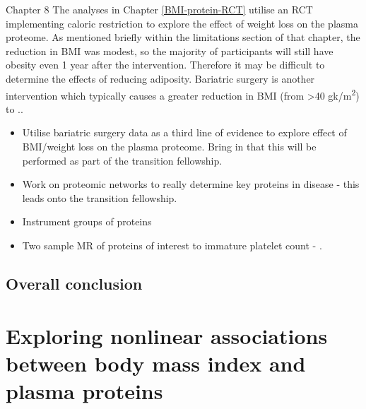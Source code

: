 \documentclass[11pt,twoside]{bristolthesis}
\providecommand{\tightlist}{%
  \setlength{\itemsep}{0pt}\setlength{\parskip}{0pt}}
\begin{document}
Chapter 8
The analyses in Chapter \ref{BMI-protein-RCT} utilise an RCT implementing caloric restriction to explore the effect of weight loss on the plasma proteome. As mentioned briefly within the limitations section of that chapter, the reduction in BMI was modest, so the majority of participants will still have obesity even 1 year after the intervention. Therefore it may be difficult to determine the effects of reducing adiposity. Bariatric surgery is another intervention which typically causes a greater reduction in BMI (from \textgreater40 gk/m\textsuperscript{2}) to ..
\begin{itemize}
\tightlist
\item
  Utilise bariatric surgery data as a third line of evidence to explore effect of BMI/weight loss on the plasma proteome. Bring in that this will be performed as part of the transition fellowship.
\item
  Work on proteomic networks to really determine key proteins in disease - this leads onto the transition fellowship.
\item
  Instrument groups of proteins
\item
  Two sample MR of proteins of interest to immature platelet count - .
\end{itemize}
\hypertarget{overall-conclusion}{%
\section{Overall conclusion}\label{overall-conclusion}}

\appendix

\hypertarget{Appendix-A}{%
\chapter{Exploring nonlinear associations between body mass index and plasma proteins}\label{Appendix-A}}
\end{document}
